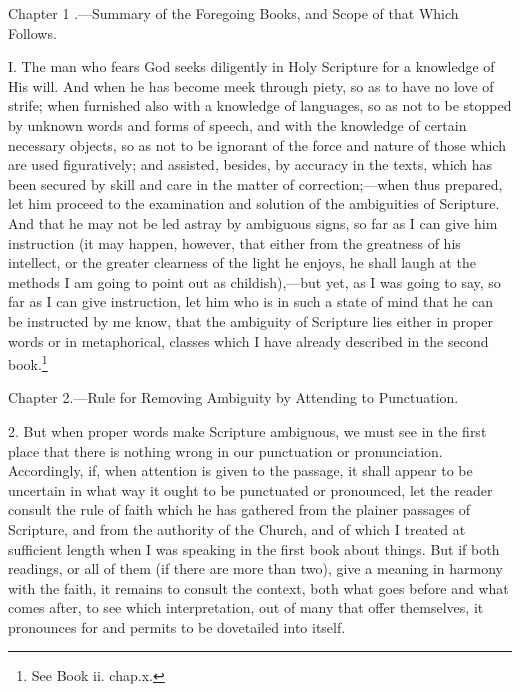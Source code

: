 
Chapter 1 .—Summary of the Foregoing Books, and Scope of that Which Follows.

I. The man who fears God seeks diligently in Holy Scripture for a knowledge of His will. And when he has become meek through piety, so as to have no love of strife; when furnished also with a knowledge of languages, so as not to be stopped by unknown words and forms of speech, and with the knowledge of certain necessary objects, so as not to be ignorant of the force and nature of those which are used figuratively; and assisted, besides, by accuracy in the texts, which has been secured by skill and care in the matter of correction;—when thus prepared, let him proceed to the examination and solution of the ambiguities of Scripture. And that he may not be led astray by ambiguous signs, so far as I can give him instruction (it may happen, however, that either from the greatness of his intellect, or the greater clearness of the light he enjoys, he shall laugh at the methods I am going to point out as childish),—but yet, as I was going to say, so far as I can give instruction, let him who is in such a state of mind that he can be instructed by me know, that the ambiguity of Scripture lies either in proper words or in metaphorical, classes which I have already described in the second book.\footnote{See Book ii. chap.x.}


Chapter 2.—Rule for Removing Ambiguity by Attending to Punctuation.

2. But when proper words make Scripture ambiguous, we must see in the first place that there is nothing wrong in our punctuation or pronunciation. Accordingly, if, when attention is given to the passage, it shall appear to  be uncertain in what way it ought to be punctuated or pronounced, let the reader consult the rule of faith which he has gathered from the plainer passages of Scripture, and from the authority of the Church, and of which I treated at sufficient length when I was speaking in the first book about things. But if both readings, or all of them (if there are more than two), give a meaning in harmony with the faith, it remains to consult the context, both what goes before and what comes after, to see which interpretation, out of many that offer themselves, it pronounces for and permits to be dovetailed into itself.

